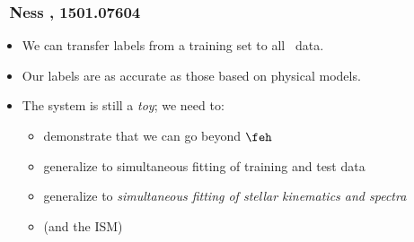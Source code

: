 \documentclass[pdftex]{beamer}
\begin{document}
\begin{frame}
  \frametitle{\tc~{\footnotesize Ness \etal, 1501.07604}}
  \begin{itemize}
  \item We can transfer labels from a training set to all \apogee\ data.
  \item Our labels are as accurate as those based on physical models.
  \item The system is still a \emph{toy}; we need to:
    \begin{itemize}
    \item demonstrate that we can go beyond $\feh$
    \item generalize to simultaneous fitting of training and test data
    \item generalize to \emph{simultaneous fitting of stellar kinematics and spectra}
    \item (and the ISM)
    \end{itemize}
  \end{itemize}
\end{frame}

\messages
\end{document}
